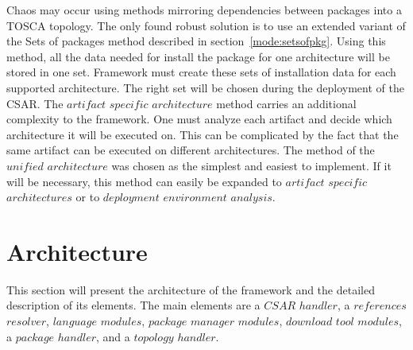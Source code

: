 Chaos may occur using methods mirroring dependencies between packages into a TOSCA topology.
The only found robust solution is to use an extended variant of the Sets of packages method described in section~\ref{mode:setsofpkg}. 
Using this method, all the data needed for install the package for one architecture will be stored in one set.
Framework must create these sets of  installation data for each supported architecture. 
The right set will be chosen during the deployment of the CSAR. %
The $artifact$ $specific$ $architecture$ method carries an additional complexity to the framework.
One must analyze each artifact and decide which architecture it will be executed on. 
This can be complicated by the fact that the same artifact can be executed on different architectures. %
The method of the $unified$ $architecture$ was chosen as the simplest and easiest to implement.
If it will be necessary, this method can easily be expanded to $artifact$ $specific$ $architectures$ or to $deployment$ $environment$ $analysis$.

%



\section{Architecture}\label{sec:arch}
This section will present the architecture of the framework and the detailed description of its elements.
The main elements are a \boldmath $CSAR$ $handler$, a $references$ $resolver$, $language$ $modules$, $package$ $manager$ $modules$, $download$ $tool$ $modules$, a $package$ $handler$, and a $topology$ $handler$. \unboldmath

